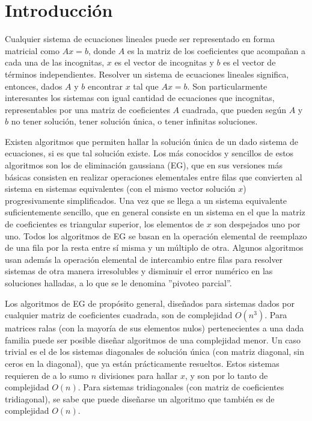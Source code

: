 \section{Introducción}

Cualquier sistema de ecuaciones lineales puede ser representado en forma matricial como $Ax=b$, donde $A$ es la matriz de los coeficientes que acompañan a cada una de las incognitas, $x$ es el vector de incognitas y $b$ es el vector de términos independientes. Resolver un sistema de ecuaciones lineales significa, entonces, dados $A$ y $b$ encontrar $x$ tal que $Ax=b$. Son particularmente interesantes los sistemas con igual cantidad de ecuaciones que incognitas, representables por una matriz de coeficientes $A$ cuadrada, que pueden según $A$ y $b$ no tener solución, tener solución única, o tener infinitas soluciones.

Existen algoritmos que permiten hallar la solución única de un dado sistema de ecuaciones, si es que tal solución existe. Los más conocidos y sencillos de estos algoritmos son los de eliminación gaussiana (EG), que en sus versiones más básicas consisten en realizar operaciones elementales entre filas que convierten al sistema en sistemas equivalentes (con el mismo vector solución $x$) progresivamente simplificados. Una vez que se llega a un sistema equivalente suficientemente sencillo, que en general consiste en un sistema en el que la matriz de coeficientes es triangular superior, los elementos de $x$ son despejados uno por uno. Todos los algoritmos de EG se basan en la operación elemental de reemplazo de una fila por la resta entre sí misma y un múltiplo de otra. Algunos algoritmos usan además la operación elemental de intercambio entre filas para resolver sistemas de otra manera irresolubles y disminuir el error numérico en las soluciones halladas, a lo que se le denomina ''pivoteo parcial''\cite{burden}\cite{metnum_EG}.

Los algoritmos de EG de propósito general, diseñados para sistemas dados por cualquier matriz de coeficientes cuadrada, son de complejidad $O(n^3)$. Para matrices ralas (con la mayoría de sus elementos nulos) pertenecientes a una dada familia puede ser posible diseñar algoritmos de una complejidad menor. Un caso trivial es el de los sistemas diagonales de solución única (con matriz diagonal, sin ceros en la diagonal), que ya están prácticamente resueltos. Estos sistemas requieren de a lo sumo $n$ divisiones para hallar $x$, y son por lo tanto de complejidad $O(n)$. Para sistemas tridiagonales (con matriz de coeficientes tridiagonal), se sabe que puede diseñarse un algoritmo que también es de complejidad $O(n)$.

